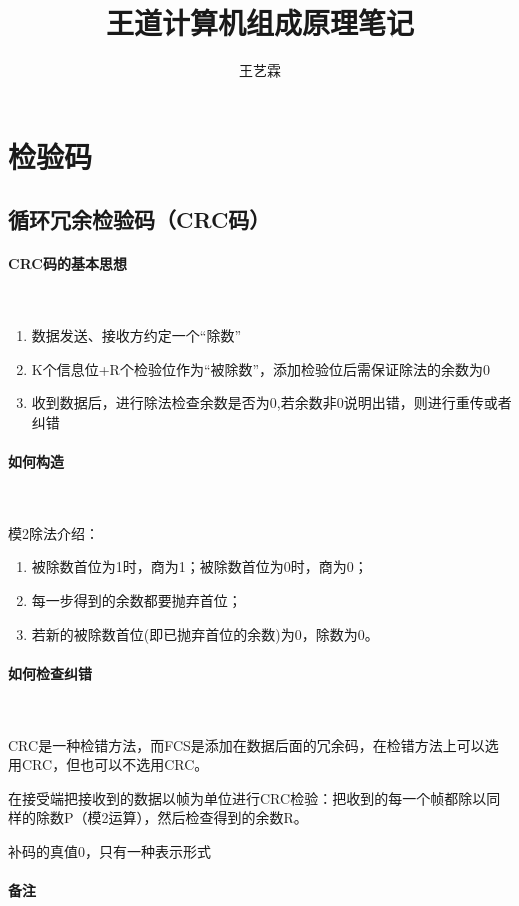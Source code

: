 \documentclass[12pt]{ctexart}
\begin{document}
    \title{王道计算机组成原理笔记}
    \author{王艺霖}
    \maketitle

\newpage

\section{检验码}
\subsection{循环冗余检验码（CRC码）}
\paragraph{CRC码的基本思想}~{}
\begin{enumerate}
    \item 数据发送、接收方约定一个“除数”
    \item K个信息位+R个检验位作为“被除数”，添加检验位后需保证除法的余数为0
    \item 收到数据后，进行除法检查余数是否为0,若余数非0说明出错，则进行重传或者纠错
\end{enumerate}


\paragraph{如何构造}~{}

模2除法介绍：
\begin{enumerate}
    \item 被除数首位为1时，商为1；被除数首位为0时，商为0；
    \item 每一步得到的余数都要抛弃首位；
    \item 若新的被除数首位(即已抛弃首位的余数)为0，除数为0。
\end{enumerate}


\paragraph{如何检查纠错}~{}

CRC是一种检错方法，而FCS是添加在数据后面的冗余码，在检错方法上可以选用CRC，但也可以不选用CRC。

在接受端把接收到的数据以帧为单位进行CRC检验：把收到的每一个帧都除以同样的除数P（模2运算），然后检查得到的余数R。


补码的真值0，只有一种表示形式
\paragraph{备注}~{}
\end{document}
